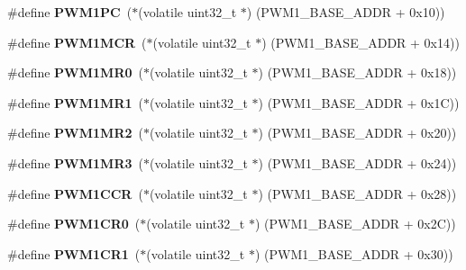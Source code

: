 \begin{DoxyCompactItemize}
\#define {\bfseries P\+W\+M1\+PC}~($\ast$(volatile uint32\+\_\+t $\ast$) (P\+W\+M1\+\_\+\+B\+A\+S\+E\+\_\+\+A\+D\+DR + 0x10))
\item 
\mbox{\label{group__lpc24xx__regs_gadf9cc55190adab8b9514ddf98ddb92e0}} 
\#define {\bfseries P\+W\+M1\+M\+CR}~($\ast$(volatile uint32\+\_\+t $\ast$) (P\+W\+M1\+\_\+\+B\+A\+S\+E\+\_\+\+A\+D\+DR + 0x14))
\item 
\mbox{\label{group__lpc24xx__regs_ga5e3c7ed6a93a33a2ff421ab506dbbafb}} 
\#define {\bfseries P\+W\+M1\+M\+R0}~($\ast$(volatile uint32\+\_\+t $\ast$) (P\+W\+M1\+\_\+\+B\+A\+S\+E\+\_\+\+A\+D\+DR + 0x18))
\item 
\mbox{\label{group__lpc24xx__regs_ga3dc224468163b553a2162b33750c715f}} 
\#define {\bfseries P\+W\+M1\+M\+R1}~($\ast$(volatile uint32\+\_\+t $\ast$) (P\+W\+M1\+\_\+\+B\+A\+S\+E\+\_\+\+A\+D\+DR + 0x1\+C))
\item 
\mbox{\label{group__lpc24xx__regs_ga98743d9f558a3fae8390507608c4cc9c}} 
\#define {\bfseries P\+W\+M1\+M\+R2}~($\ast$(volatile uint32\+\_\+t $\ast$) (P\+W\+M1\+\_\+\+B\+A\+S\+E\+\_\+\+A\+D\+DR + 0x20))
\item 
\mbox{\label{group__lpc24xx__regs_gaf8b53ed3ef205b54401b4449b143ad97}} 
\#define {\bfseries P\+W\+M1\+M\+R3}~($\ast$(volatile uint32\+\_\+t $\ast$) (P\+W\+M1\+\_\+\+B\+A\+S\+E\+\_\+\+A\+D\+DR + 0x24))
\item 
\mbox{\label{group__lpc24xx__regs_ga0592322a5e3106eae339150942ad0849}} 
\#define {\bfseries P\+W\+M1\+C\+CR}~($\ast$(volatile uint32\+\_\+t $\ast$) (P\+W\+M1\+\_\+\+B\+A\+S\+E\+\_\+\+A\+D\+DR + 0x28))
\item 
\mbox{\label{group__lpc24xx__regs_ga0adfdfeca7f74c317066718115cd9993}} 
\#define {\bfseries P\+W\+M1\+C\+R0}~($\ast$(volatile uint32\+\_\+t $\ast$) (P\+W\+M1\+\_\+\+B\+A\+S\+E\+\_\+\+A\+D\+DR + 0x2\+C))
\item 
\mbox{\label{group__lpc24xx__regs_gaaa495456c7c8bcddbdadf1755d7252a7}} 
\#define {\bfseries P\+W\+M1\+C\+R1}~($\ast$(volatile uint32\+\_\+t $\ast$) (P\+W\+M1\+\_\+\+B\+A\+S\+E\+\_\+\+A\+D\+DR + 0x30))

\end{DoxyCompactItemize}
